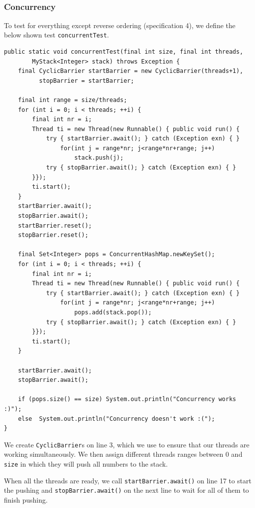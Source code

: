 \documentclass[a5paper]{article}
\begin{document}
\subsection{}
\subsubsection{Concurrency}
To test for everything except reverse ordering (specification 4), we define the below shown test \texttt{concurrentTest}.
\begin{lstlisting}
public static void concurrentTest(final int size, final int threads,  
        MyStack<Integer> stack) throws Exception {
    final CyclicBarrier startBarrier = new CyclicBarrier(threads+1), 
          stopBarrier = startBarrier;

    final int range = size/threads;
    for (int i = 0; i < threads; ++i) {
        final int nr = i;
        Thread ti = new Thread(new Runnable() { public void run() {
            try { startBarrier.await(); } catch (Exception exn) { }
                for(int j = range*nr; j<range*nr+range; j++)
                    stack.push(j);
            try { stopBarrier.await(); } catch (Exception exn) { }
        }});
        ti.start();
    }
    startBarrier.await();
    stopBarrier.await();
    startBarrier.reset();
    stopBarrier.reset();

    final Set<Integer> pops = ConcurrentHashMap.newKeySet();
    for (int i = 0; i < threads; ++i) {
        final int nr = i;
        Thread ti = new Thread(new Runnable() { public void run() {
            try { startBarrier.await(); } catch (Exception exn) { }
                for(int j = range*nr; j<range*nr+range; j++)
                    pops.add(stack.pop());
            try { stopBarrier.await(); } catch (Exception exn) { }
        }});
        ti.start();
    }

    startBarrier.await();
    stopBarrier.await();

    if (pops.size() == size) System.out.println("Concurrency works :)");
    else  System.out.println("Concurrency doesn't work :(");
}
\end{lstlisting}

We create \texttt{CyclicBarrier}s on line 3, which we use to ensure that our threads are working simultaneously. 
We then assign different threads ranges between 0 and \texttt{size} in which they will push all numbers to the stack.

When all the threads are ready, we call \texttt{startBarrier.await()} on line 17 to start the pushing and \texttt{stopBarrier.await()} on the next line
to wait for all of them to finish pushing. 
\end{document}
